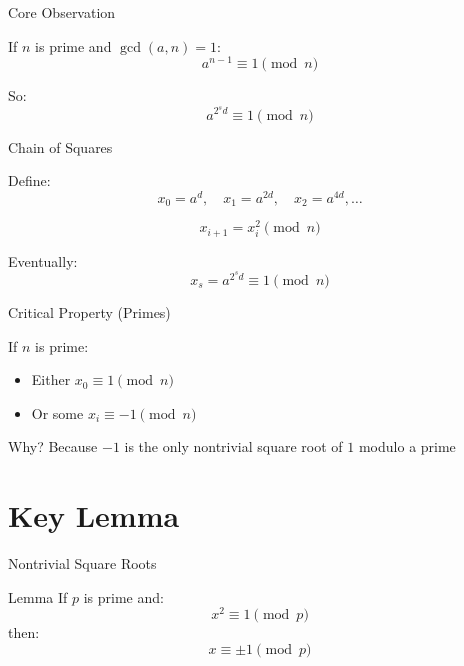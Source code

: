 \documentclass{beamer}
\begin{document}
\begin{frame}{Core Observation}

If $n$ is prime and $\gcd(a,n)=1$:
\[
a^{n-1} \equiv 1 \pmod{n}
\]

\vspace{1em}

So:
\[
a^{2^s d} \equiv 1 \pmod{n}
\]

\end{frame}


\begin{frame}{Chain of Squares}

Define:
\[
x_0 = a^d, \quad x_1 = a^{2d}, \quad x_2 = a^{4d}, \dots
\]

\[
x_{i+1} = x_i^2 \pmod{n}
\]

\vspace{1em}

Eventually:
\[
x_s = a^{2^s d} \equiv 1 \pmod{n}
\]

\end{frame}


\begin{frame}{Critical Property (Primes)}

If $n$ is prime:

\begin{itemize}
    \item Either $x_0 \equiv 1 \pmod{n}$
    \item Or some $x_i \equiv -1 \pmod{n}$
\end{itemize}

\vspace{1em}

\begin{block}{Why?}
Because $-1$ is the only nontrivial square root of $1$ modulo a prime
\end{block}

\end{frame}

\section{Key Lemma}

\begin{frame}{Nontrivial Square Roots}

\begin{block}{Lemma}
If $p$ is prime and:
\[
x^2 \equiv 1 \pmod{p}
\]
then:
\[
x \equiv \pm 1 \pmod{p}
\]
\end{block}

\end{frame}
\end{document}
